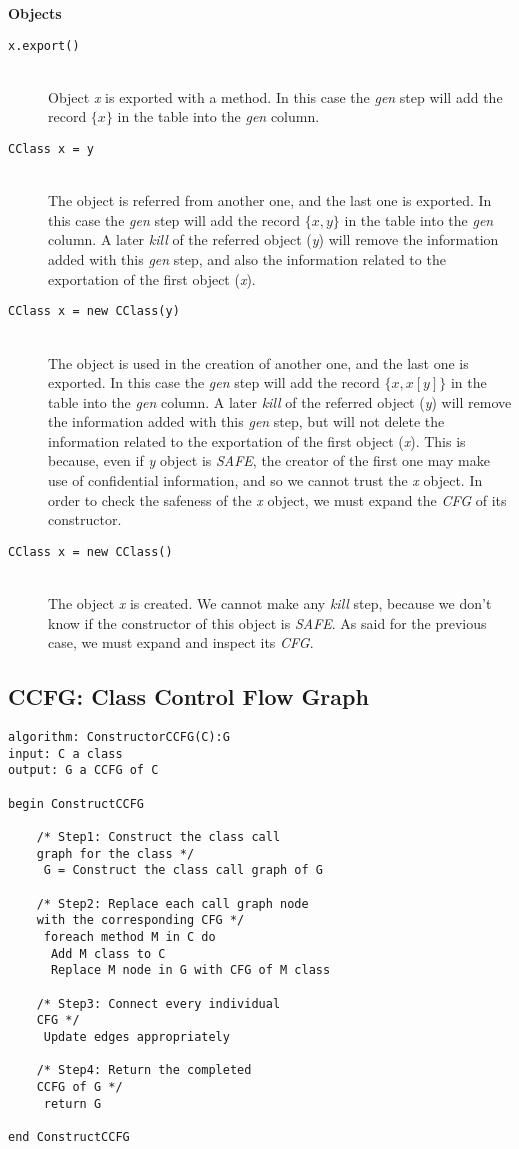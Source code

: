 \documentclass[letterpaper,twocolumn,10pt]{article}
\begin{document}
\noindent\textbf{Objects}
\begin{description}
\item[\texttt{x.export()}] \hfill \\
Object \emph{x} is exported with a method. In this case the \emph{gen} step will add the record $\{x\}$ in the table into the \emph{gen} column.

\item[\texttt{CClass x = y}] \hfill \\
The object is referred from another one, and the last one is exported. In this case the \emph{gen} step will add the record $\{x, y\}$ in the table into the \emph{gen} column. A later \emph{kill} of the referred object (\emph{y}) will remove the information added with this \emph{gen} step, and also the information related to the exportation of the first object (\emph{x}).

\item[\texttt{CClass x = new CClass(y)}] \hfill \\
The object is used in the creation of another one, and the last one is exported. In this case the \emph{gen} step will add the record $\{x, x[y]\}$ in the table into the \emph{gen} column. A later \emph{kill} of the referred object (\emph{y}) will remove the information added with this \emph{gen} step, but will not delete the information related to the exportation of the first object (\emph{x}). This is because, even if \emph{y} object is \emph{SAFE}, the creator of the first one may make use of confidential information, and so we cannot trust the \emph{x} object. In order to check the safeness of the \emph{x} object, we must expand the \emph{CFG} of its constructor.

\item[\texttt{CClass x = new CClass()}] \hfill \\
The object \emph{x} is created. We cannot make any \emph{kill} step, because we don't know if the constructor of this object is \emph{SAFE}. As said for the previous case, we must expand and inspect its \emph{CFG}.
\end{description}

\subsection{CCFG: Class Control Flow Graph~\cite{CCFG}}
\lstset{basicstyle=\small\ttfamily, tabsize=2}
\begin{lstlisting}
algorithm: ConstructorCCFG(C):G
input: C a class
output: G a CCFG of C

begin ConstructCCFG
	
	/* Step1: Construct the class call 
	graph for the class */ 
	 G = Construct the class call graph of G
	  
	/* Step2: Replace each call graph node 
	with the corresponding CFG */
	 foreach method M in C do
	  Add M class to C	  
	  Replace M node in G with CFG of M class

	/* Step3: Connect every individual 
	CFG */
	 Update edges appropriately 

	/* Step4: Return the completed 
	CCFG of G */
	 return G

end ConstructCCFG
\end{lstlisting}
\end{document}
